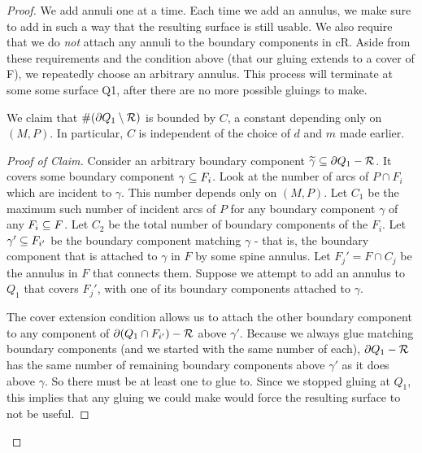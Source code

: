 \begin{proof}
We add annuli one at a time. Each time we add an annulus, we make sure to add
in such a way that the resulting surface is still usable. We also require that
we do \emph{not} attach any annuli to the boundary components in cR. Aside from
these requirements and the condition above (that our gluing extends to a cover
of F), we repeatedly choose an arbitrary annulus. This process will terminate
at some some surface Q1, after there are no more possible gluings to make.

\begin{claim}

We claim that $\#(\partial Q_1 \setminus \mathcal{R})$ is bounded by $C$, a constant
depending only on $(M,P)$. In particular, $C$ is independent of the choice of
$d$ and $m$ made earlier.

\end{claim}

\begin{proof}[Proof of Claim]

Consider an arbitrary boundary component $\widetilde{\gamma} \subseteq \partial Q_1
- \mathcal{R}$.  It covers some boundary component $\gamma \subseteq F_i$. Look at the
number of arcs of $P \cap F_i$ which are incident to $\gamma$. This number
depends only on $(M,P)$. Let $C_1$ be the maximum such number of incident arcs
of $P$ for any boundary component $\gamma$ of any $F_i \subseteq F$. Let $C_2$ be
the total number of boundary components of the $F_i$. Let $\gamma' \subseteq F_{i'}$
be the boundary component matching $\gamma$ - that is, the boundary component
that is attached to $\gamma$ in $F$ by some spine annulus. Let $F_j'= F \cap
C_j$ be the annulus in $F$ that connects them.  Suppose we attempt to add an
annulus to $Q_1$ that covers $F_j'$, with one of its boundary components
attached to $\gamma$.

The cover extension condition allows us to attach the other boundary component
to any component of $\partial(Q_1 \cap F_{i'}) - \mathcal{R}$ above $\gamma'$.  Because we
always glue matching boundary components (and we started with the same number
of each), $\partial Q_1 - \mathcal{R}$ has the same number of remaining boundary components
above $\gamma'$ as it does above $\gamma$. So there must be at least one to
glue to.  Since we stopped gluing at $Q_1$, this implies that any gluing we
could make would force the resulting surface to not be useful.


\end{proof}
\end{proof}

